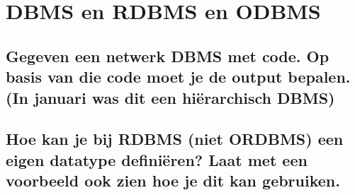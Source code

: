 \newpage
\section{DBMS en RDBMS en ODBMS}

\subsection{Gegeven een netwerk DBMS met code. Op basis van die code moet je de output bepalen. (In januari was dit een hiërarchisch DBMS)}


\subsection{Hoe kan je bij RDBMS (niet ORDBMS) een eigen datatype definiëren? Laat met een voorbeeld ook zien hoe je dit kan gebruiken.}